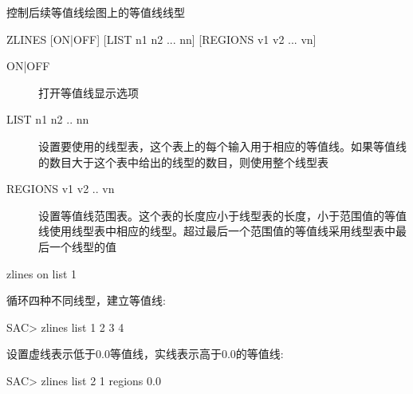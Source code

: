 \label{cmd:zlines}

控制后续等值线绘图上的等值线线型

\begin{SACSTX}
ZLINES  [ON|OFF] [LIST n1 n2 ... nn] [REGIONS v1 v2 ... vn]
\end{SACSTX}

\begin{description}
\item [ON|OFF] 打开等值线显示选项 
\item [LIST n1 n2 .. nn] 设置要使用的线型表，这个表上的每个输入用于相应的等值线。如果等值线的数目大于这个表中给出的线型的数目，则使用整个线型表 
\item [REGIONS v1 v2 .. vn] 设置等值线范围表。这个表的长度应小于线型表的长度，小于范围值的等值线使用线型表中相应的线型。超过最后一个范围值的等值线采用线型表中最后一个线型的值
\end{description}

\begin{SACDFT}
zlines on list 1
\end{SACDFT}

循环四种不同线型，建立等值线:
\begin{SACCode}
SAC> zlines list 1 2 3 4
\end{SACCode}

设置虚线表示低于0.0等值线，实线表示高于0.0的等值线:
\begin{SACCode}
SAC> zlines list 2 1 regions 0.0
\end{SACCode}

